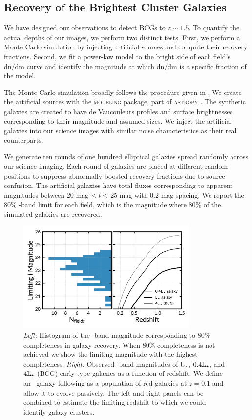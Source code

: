 \documentclass[apj, revtex4-1]{emulateapj}
\begin{document}
\subsection{Recovery of the Brightest Cluster Galaxies}
We have designed our observations to detect BCGs to $z\sim1.5$. To quantify the actual depths of our images, we perform two distinct tests. First, we perform a Monte Carlo simulation by injecting artificial sources and compute their recovery fractions. Second, we fit a power-law model to the bright side of each field's dn/dm curve and identify the magnitude at which dn/dm is a specific fraction of the model.

The Monte Carlo simulation broadly follows the procedure given in \cite{Menanteau2010a}. We create the artificial sources with the \textsc{modeling} package, part of \textsc{astropy} \citep{TheAstropyCollaboration2013}. The synthetic galaxies are created to have de Vaucouleurs \citep{DeVaucouleurs1948} profiles and surface brightnesses corresponding to their magnitude and assumed sizes. We inject the artificial galaxies into our science images with similar noise characteristics as their real counterparts.

We generate ten rounds of one hundred elliptical galaxies spread randomly across our science imaging. Each round of galaxies are placed at different random positions to suppress abnormally boosted recovery fractions due to source confusion. The artificial galaxies have total fluxes corresponding to apparent magnitudes between 20 mag $< \hbox{$i$} <$ 25 mag with $0.2$ mag spacing. We report the 80\% \sdssi-band limit for each field, which is the magnitude where 80\% of the simulated galaxies are recovered.

\begin{figure}
	\centering
	\includegraphics[width=0.8\textwidth]{figures/recovery_redshift.pdf}
	\caption{\textit{Left:} Histogram of the \sdssi-band magnitude corresponding to 80\% completeness in galaxy recovery. When 80\% completeness is not achieved we show the limiting magnitude with the highest completeness. \textit{Right:} Observed \sdssi-band magnitudes of $\hbox{L$_{\star}$}$, $0.4\hbox{L$_{\star}$}$, and $4\hbox{L$_{\star}$}$ (BCG) early-type galaxies as a function of redshift. We define an \lstar\ galaxy following \cite{Blanton2003} as a population of red galaxies at $z = 0.1$ and allow it to evolve passively. The left and right panels can be combined to estimate the limiting redshift to which we could identify galaxy clusters.}
	\label{fig:recovery_redshift}
\end{figure}
\end{document}
